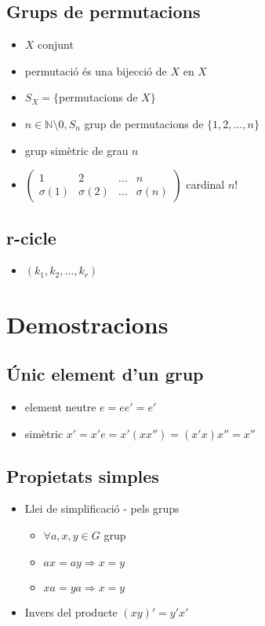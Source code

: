 \documentclass{article}
\newcommand{\N}{\mathbb{N}}
\begin{document}
\subsection{Grups de permutacions}
\begin{itemize}
\item $X$ conjunt
\item permutació és una bijecció de $X$ en $X$
\item $S_X = \{$permutacions de $X\}$
\item $n \in \N\setminus 0, S_n$ grup de permutacions de $\{1, 2,\dots , n\}$
\item grup simètric de grau $n$
\item $\begin{pmatrix}1 & 2 & \dots & n\\ \sigma(1) & \sigma(2) & \dots & \sigma(n)\end{pmatrix}$ cardinal $n!$
\end{itemize}
\subsection{r-cicle}
\begin{itemize}
\item $(k_1, k_2, \dots, k_r)$
\end{itemize}


\newpage\section{Demostracions}
\subsection{Únic element d'un grup}
\begin{itemize}
\item element neutre $e = ee' = e'$
\item simètric $x' = x'e = x'(xx'') = (x'x)x'' = x''$
\end{itemize}
\subsection{Propietats simples}
\begin{itemize}
\item Llei de simplificació - pels grups
	\begin{itemize}
	\item $\forall a, x, y \in G$ grup
	\item $ax = ay \Rightarrow x = y$
	\item $xa = ya \Rightarrow x = y$
	\end{itemize}
\item Invers del producte
	\subitem $(xy)' = y'x'$
\end{itemize}
\end{document}
